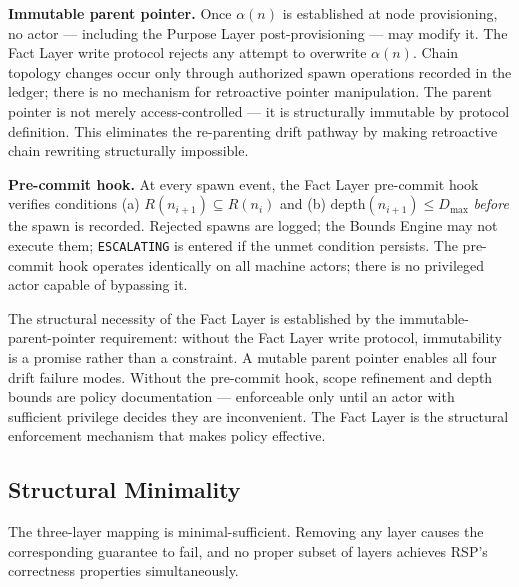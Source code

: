 \medskip
\noindent\textbf{Immutable parent pointer.} Once $\alpha(n)$ is established at node provisioning, no actor — including the Purpose Layer post-provisioning — may modify it. The Fact Layer write protocol rejects any attempt to overwrite $\alpha(n)$. Chain topology changes occur only through authorized spawn operations recorded in the ledger; there is no mechanism for retroactive pointer manipulation. The parent pointer is not merely access-controlled — it is structurally immutable by protocol definition. This eliminates the re-parenting drift pathway by making retroactive chain rewriting structurally impossible.

\medskip
\noindent\textbf{Pre-commit hook.} At every spawn event, the Fact Layer pre-commit hook verifies conditions (a) $R(n_{i+1}) \subseteq R(n_i)$ and (b) $\mathrm{depth}(n_{i+1}) \leq D_{\mathrm{max}}$ \emph{before} the spawn is recorded. Rejected spawns are logged; the Bounds Engine may not execute them; \texttt{ESCALATING} is entered if the unmet condition persists. The pre-commit hook operates identically on all machine actors; there is no privileged actor capable of bypassing it.

The structural necessity of the Fact Layer is established by the immutable-parent-pointer requirement: without the Fact Layer write protocol, immutability is a promise rather than a constraint. A mutable parent pointer enables all four drift failure modes. Without the pre-commit hook, scope refinement and depth bounds are policy documentation — enforceable only until an actor with sufficient privilege decides they are inconvenient. The Fact Layer is the structural enforcement mechanism that makes policy effective.

\subsection{Structural Minimality}
\label{sec:rs-minimality}

The three-layer mapping is minimal-sufficient. Removing any layer causes the corresponding guarantee to fail, and no proper subset of layers achieves RSP's correctness properties simultaneously.

